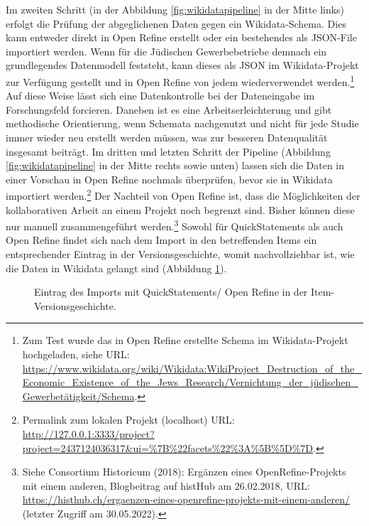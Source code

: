 Im zweiten Schritt (in der Abbildung \ref{fig:wikidatapipeline} in der Mitte links) erfolgt die Prüfung der abgeglichenen Daten gegen ein Wikidata-Schema. Dies kann entweder direkt in Open Refine erstellt oder ein bestehendes als JSON-File importiert werden. Wenn für die Jüdischen Gewerbebetriebe demnach ein grundlegendes Datenmodell feststeht, kann dieses als JSON im Wikidata-Projekt zur Verfügung gestellt und in Open Refine von jedem wiederverwendet werden.\footnote{Zum Test wurde das in Open Refine erstellte Schema im Wikidata-Projekt hochgeladen, siehe URL: \url{https://www.wikidata.org/wiki/Wikidata:WikiProject\_Destruction\_of\_the\_Economic\_Existence\_of\_the\_Jews\_Research/Vernichtung\_der\_jüdischen\_Gewerbetätigkeit/Schema}.} Auf diese Weise lässt sich eine Datenkontrolle bei der Dateneingabe im Forschungsfeld forcieren. Daneben ist es eine Arbeitserleichterung und gibt methodische Orientierung, wenn Schemata nachgenutzt und nicht für jede Studie immer wieder neu erstellt werden müssen, was zur besseren Datenqualität insgesamt beiträgt. Im dritten und letzten Schritt der Pipeline (Abbildung \ref{fig:wikidatapipeline} in der Mitte rechts sowie unten) lassen sich die Daten in einer Vorschau in Open Refine nochmals überprüfen, bevor sie in Wikidata importiert werden.\footnote{Permalink zum lokalen Projekt (localhost) URL: \url{http://127.0.0.1:3333/project?project=2437124036317\&ui=\%7B\%22facets\%22\%3A\%5B\%5D\%7D}.} Der Nachteil von Open Refine ist, dass die Möglichkeiten der kollaborativen Arbeit an einem Projekt noch begrenzt sind. Bisher können diese nur manuell zusammengeführt werden.\footnote{Siehe Consortium Historicum (2018): Ergänzen eines OpenRefine-Projekts mit einem anderen, Blogbeitrag auf histHub am 26.02.2018, URL: \url{https://histhub.ch/ergaenzen-eines-openrefine-projekts-mit-einem-anderen/} (letzter Zugriff am 30.05.2022).} Sowohl für QuickStatements als auch Open Refine findet sich nach dem Import in den betreffenden Items ein entsprechender Eintrag in der Versionsgeschichte, womit nachvollziehbar ist, wie die Daten in Wikidata gelangt sind (Abbildung \ref{fig:wikidataversions}).

\begin{figure}[h]
    \centering
    \caption[Import-Eintrag in der Versionsgeschichte in Wikidata]{Eintrag des Imports mit QuickStatements/ Open Refine in der Item-Versionsgeschichte.}
    \label{fig:wikidataversions}
\end{figure}

